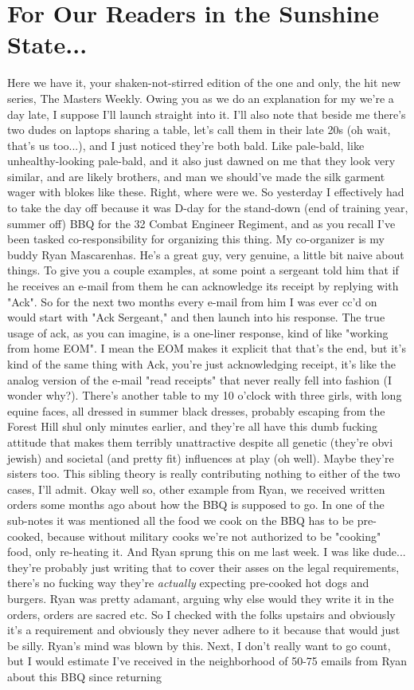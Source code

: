 \documentclass[12pt]{article}
\begin{document}
\section*{For Our Readers in the Sunshine State...}
Here we have it, your shaken-not-stirred edition of the one and only, the hit new series, The Masters Weekly. Owing you as we do an explanation for my we're a day late, I suppose I'll launch straight into it. I'll also note that beside me there's two dudes on laptops sharing a table, let's call them in their late 20s (oh wait, that's us too...), and I just noticed they're both bald. Like pale-bald, like unhealthy-looking pale-bald, and it also just dawned on me that they look very similar, and are likely brothers, and man we should've made the silk garment wager with blokes like these. Right, where were we. So yesterday I effectively had to take the day off because it was D-day for the stand-down (end of training year, summer off) BBQ for the 32 Combat Engineer Regiment, and as you recall I've been tasked co-responsibility for organizing this thing. My co-organizer is my buddy Ryan Mascarenhas. He's a great guy, very genuine, a little bit naive about things. To give you a couple examples, at some point a sergeant told him that if he receives an e-mail from them he can acknowledge its receipt by replying with "Ack". So for the next two months every e-mail from him I was ever cc'd on would start with "Ack Sergeant," and then launch into his response. The true usage of ack, as you can imagine, is a one-liner response, kind of like "working from home EOM". I mean the EOM makes it explicit that that's the end, but it's kind of the same thing with Ack, you're just acknowledging receipt, it's like the analog version of the e-mail "read receipts" that never really fell into fashion (I wonder why?). There's another table to my 10 o'clock with three girls, with long equine faces, all dressed in summer black dresses, probably escaping from the Forest Hill shul only minutes earlier, and they're all have this dumb fucking attitude that makes them terribly unattractive despite all genetic (they're obvi jewish) and societal (and pretty fit) influences at play (oh well). Maybe they're sisters too. This sibling theory is really contributing nothing to either of the two cases, I'll admit. Okay well so, other example from Ryan, we received written orders some months ago about how the BBQ is supposed to go. In one of the sub-notes it was mentioned all the food we cook on the BBQ has to be pre-cooked, because without military cooks we're not authorized to be "cooking" food, only re-heating it. And Ryan sprung this on me last week. I was like dude... they're probably just writing that to cover their asses on the legal requirements, there's no fucking way they're \textit{actually} expecting pre-cooked hot dogs and burgers. Ryan was pretty adamant, arguing why else would they write it in the orders, orders are sacred etc. So I checked with the folks upstairs and obviously it's a requirement and obviously they never adhere to it because that would just be silly. Ryan's mind was blown by this. Next, I don't really want to go count, but I would estimate I've received in the neighborhood of 50-75 emails from Ryan about this BBQ since returning 
\end{document}
